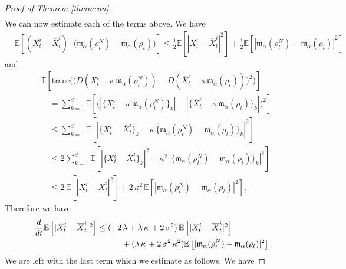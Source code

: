 \documentclass[12pt]{amsart}
\newcommand{\rd}{{\rm d} }
\newcommand{\EE}{{\mathbb E}}
\numberwithin{equation}{section}
\begin{document}
\begin{proof}[Proof of Theorem \ref{thmmean}]
\begin{align*}
\end{align*}
We can now estimate each of the terms above. We have
\begin{align*}
    & \EE\left[(X^{i}_{t} - \overline{X}^{i}_{t})\cdot \big(\mathfrak{m}_{\alpha}(\rho^{N}_{t}) - \mathfrak{m}_{\alpha}(\rho_{t})\big)\right] \leq \frac{1}{2}\EE\left[|X^{i}_{t} - \overline{X}^{i}_{t}|^{2}\right] + \frac{1}{2}\EE\left[|\mathfrak{m}_{\alpha}(\rho^{N}_{t}) - \mathfrak{m}_{\alpha}(\rho_{t})|^{2}\right]
\end{align*}
and
\begin{align*}
    & \EE\left[\text{trace}\bigg(\big( D(X^{i}_{t} - \kappa\, \mathfrak{m}_{\alpha}(\rho^{N}_{t})) - D(\overline{X}^{i}_{t} - \kappa\,\mathfrak{m}_{\alpha}(\rho_{t})) \big)^{2}\bigg)\right] \\
    & \quad =  \sum\limits_{k=1}^{d} \EE\left[
    \bigg( |\{X^{i}_{t} - \kappa\,\mathfrak{m}_{\alpha}(\rho^{N}_{t})\}_{k}| - |\{\overline{X}^{i}_{t} - \kappa\,\mathfrak{m}_{\alpha}(\rho_{t})\}_{k}| \bigg)^{2}
    \right]\\
    & \quad \leq \sum\limits_{k=1}^{d} \EE\left[
    \left|\big\{X^{i}_{t}-\overline{X}^{i}_{t}\big\}_{k} - \kappa\,\{\mathfrak{m}_{\alpha}(\rho^{N}_{t}) - \mathfrak{m}_{\alpha}(\rho_{t})\big\}_{k}\right| ^{2}
    \right]\\
    & \quad \leq 2 \sum\limits_{k=1}^{d} \EE\left[
    \left|\big\{X^{i}_{t}-\overline{X}^{i}_{t}\big\}_{k}\right|^{2} + \kappa^{2}\,\left|\{\mathfrak{m}_{\alpha}(\rho^{N}_{t}) - \mathfrak{m}_{\alpha}(\rho_{t})\big\}_{k}\right| ^{2}
    \right]\\
    & \quad \leq 2\, \EE\left[|X^{i}_{t} - \overline{X}^{i}_{t}|^{2}\right] + 2 \,\kappa^{2}\,\EE\left[|\mathfrak{m}_{\alpha}(\rho^{N}_{t}) - \mathfrak{m}_{\alpha}(\rho_{t})|^{2}\right] .
\end{align*}
Therefore we have
\begin{equation}\label{eq: estimate final proof}
\begin{aligned}
    \frac{\rd}{\rd t}\EE\left[|X^{i}_{t} - \overline{X}^{i}_{t}|^{2}\right]  & \leq (-2\,\lambda + \lambda\,\kappa\, +2\,\sigma^{2})\, \EE\left[|X^{i}_{t} - \overline{X}^{i}_{t}|^{2}\right] \\
    &\quad \quad \quad  + (\lambda\,\kappa\, + 2\,\sigma^{2}\,\kappa^{2})\EE\left[|\mathfrak{m}_{\alpha}(\rho^{N}_{t}) - \mathfrak{m}_{\alpha}(\rho_{t})|^{2}\right].
\end{aligned}
\end{equation}
We are left with the last term which we estimate as follows. We have

\end{proof}
\end{document}
